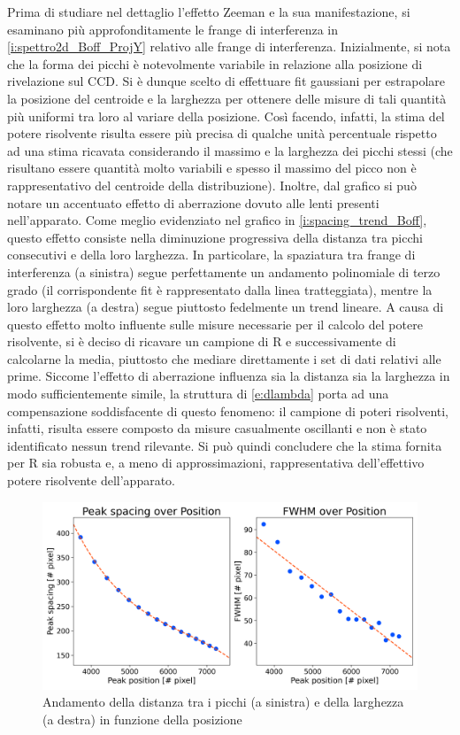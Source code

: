 \documentclass[twocolumn,10pt]{asme2ej}
\begin{document}
Prima di studiare nel dettaglio l'effetto Zeeman e la sua manifestazione, si esaminano più approfonditamente le frange
di interferenza in \autoref{i:spettro2d_Boff_ProjY} relativo alle frange di interferenza. Inizialmente, si nota che la
forma dei picchi è notevolmente variabile in relazione alla posizione di rivelazione sul CCD. Si è dunque scelto di
effettuare fit gaussiani per estrapolare la posizione del centroide e la larghezza per ottenere delle misure di tali
quantità più uniformi tra loro al variare della posizione. Così facendo, infatti, la stima del potere risolvente risulta
essere più precisa di qualche unità percentuale rispetto ad una stima ricavata considerando il massimo e la larghezza
dei picchi stessi (che risultano essere quantità molto variabili e spesso il massimo del picco non è rappresentativo del
centroide della distribuzione). 
Inoltre, dal grafico si può notare un accentuato effetto di aberrazione dovuto alle lenti presenti nell'apparato. Come
meglio evidenziato nel grafico in \autoref{i:spacing_trend_Boff}, questo effetto consiste nella diminuzione progressiva
della distanza tra picchi consecutivi e della loro larghezza. In particolare, la spaziatura tra frange di interferenza
(a sinistra) segue perfettamente un andamento polinomiale di terzo grado (il corrispondente fit è rappresentato dalla
linea tratteggiata), mentre la loro larghezza (a destra) segue piuttosto fedelmente un trend lineare. A causa di questo
effetto molto influente sulle misure necessarie per il calcolo del potere risolvente, si è deciso di ricavare un
campione di R e successivamente di calcolarne la media, piuttosto che mediare direttamente i set di dati relativi alle
prime. Siccome l'effetto di aberrazione influenza sia la distanza sia la larghezza in modo sufficientemente simile, la
struttura di \autoref{e:dlambda} porta ad una compensazione soddisfacente di questo fenomeno: il campione di poteri
risolventi, infatti, risulta essere composto da misure casualmente oscillanti e non è stato identificato nessun trend
rilevante. Si può quindi concludere che la stima fornita per R sia robusta e, a meno di approssimazioni, rappresentativa
dell'effettivo potere risolvente dell'apparato.

\begin{figure}
    \centering
    \includegraphics[width=\linewidth]{../Plots/Boff_spacing_trend.png}
    \caption{Andamento della distanza tra i picchi (a sinistra) e della larghezza (a destra) in funzione della posizione}
    \label{i:spacing_trend_Boff}
    \vspace{-10pt}
\end{figure}
\end{document}
